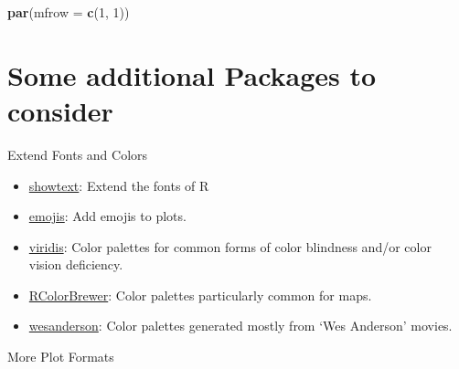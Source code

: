 \documentclass[
]{book}
\newenvironment{Shaded}{\begin{snugshade}}{\end{snugshade}}
\newcommand{\DataTypeTok}[1]{\textcolor[rgb]{0.13,0.29,0.53}{#1}}
\newcommand{\DecValTok}[1]{\textcolor[rgb]{0.00,0.00,0.81}{#1}}
\newcommand{\KeywordTok}[1]{\textcolor[rgb]{0.13,0.29,0.53}{\textbf{#1}}}
\newcommand{\NormalTok}[1]{#1}
\begin{document}
\begin{Shaded}
\begin{Highlighting}[]
\KeywordTok{par}\NormalTok{(}\DataTypeTok{mfrow =} \KeywordTok{c}\NormalTok{(}\DecValTok{1}\NormalTok{, }\DecValTok{1}\NormalTok{))}
\end{Highlighting}
\end{Shaded}

\hypertarget{some-additional-packages-to-consider}{%
\section{Some additional Packages to consider}\label{some-additional-packages-to-consider}}

Extend Fonts and Colors

\begin{itemize}
\item
  \href{https://cran.r-project.org/web/packages/showtext/}{showtext}: Extend the fonts of R
\item
  \href{https://cran.r-project.org/web/packages/emojifont/}{emojis}: Add emojis to plots.
\item
  \href{https://cran.r-project.org/web/packages/viridis/index.html}{viridis}: Color palettes for common forms of color blindness and/or color vision deficiency.
\item
  \href{https://cran.r-project.org/web/packages/RColorBrewer/index.html}{RColorBrewer}: Color palettes particularly common for maps.
\item
  \href{https://cran.r-project.org/web/packages/wesanderson/index.html}{wesanderson}: Color palettes generated mostly from `Wes Anderson' movies.
\end{itemize}

More Plot Formats
\end{document}
